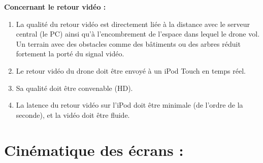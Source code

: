 \documentclass{article}
\begin{document}
	    \begin{flushleft}
	        \textbf{Concernant le retour vidéo :}
	    \end{flushleft}
	     \begin{enumerate}
	     \item La qualité du retour vidéo est directement liée à la distance avec le serveur central (le PC) ainsi qu'à l'encombrement de l'espace dans lequel le drone vol. Un terrain avec des obstacles comme des bâtiments ou des arbres réduit fortement la porté du signal vidéo.
	     \item Le retour vidéo du drone doit être envoyé à un iPod Touch en temps réel.
	     \item Sa qualité doit être convenable (HD).
		 \item La latence du retour vidéo sur l'iPod doit être minimale (de l'ordre de la seconde), et la vidéo doit être fluide.
		 \end{enumerate}
		 
\section{Cinématique des écrans :}
\end{document}
